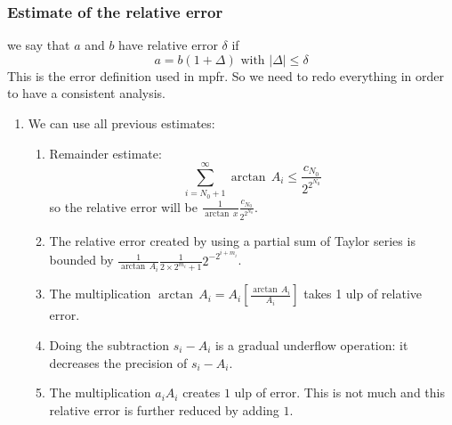 \documentclass[12pt]{amsart}
\begin{document}
\subsubsection{Estimate of the relative error}
\noindent we say that $a$ and $b$ have relative error $\delta$ if
\begin{equation*}
a=b(1+\Delta)\mbox{~with~}|\Delta|\leq \delta
\end{equation*}
This is the error definition used in mpfr. So we need to redo everything in order to have a consistent analysis.
\begin{enumerate}
\item We can use all previous estimates:
\begin{enumerate}
\item Remainder estimate:
\begin{equation*}
\sum_{i=N_0+1}^{\infty}\arctan\,A_i\leq \frac{c_{N_0}}{2^{2^{N_0}}}
\end{equation*}
so the relative error will be $\frac{1}{\arctan\,x}\frac{c_{N_0}}{2^{2^{N_0}}}$.
\item The relative error created by using a partial sum of Taylor series is
bounded by $\frac{1}{\arctan\,A_i}\frac{1}{2 \times 2^{m_i}+1} 2^{-2^{i+m_i}}$.
\item The multiplication $\arctan\,A_i=A_i[\frac{\arctan\,A_i}{A_i}]$ takes
1 ulp of relative error.
\item Doing the subtraction $s_i-A_i$ is a gradual underflow operation:
it decreases the precision of $s_i-A_i$.
\item The multiplication $a_iA_i$ creates $1$ ulp of error. This is not
much and this relative error is further reduced by adding $1$.
\end{enumerate}
\end{enumerate}
\end{document}
